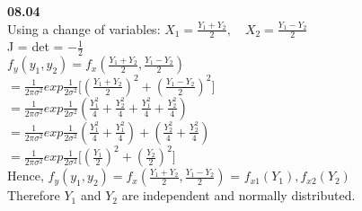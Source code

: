 {\bf 08.04} \\
 
Using a change of variables: \quad $X_1 = \frac{Y_1 + Y_2}{2}, \quad X_2 = \frac{Y_1 - Y_2}{2}$ \\
 
J = det = $ - \frac{1}{2}$ \\
 
$f_y{(y_1,y_2)} = f_x{\left (\frac{Y_1 + Y_2}{2},\frac{Y_1 - Y_2}{2} \right)}$ \\
 
$ = \frac{1}{2 \pi \sigma^2}exp{\frac{1}{2 \sigma^2}}\Big[{\left (\frac{Y_1 + Y_2}{2} \right)^2 + \left (\frac{Y_1 - Y_2}{2} \right)^2}\Big]$ \\
 
$ = \frac{1}{2 \pi \sigma^2}exp{\frac{1}{2 \sigma^2}}{\left (\frac{Y_1^2}{4} + \frac{Y_2^2}{4} + \frac{Y_1^2}{4} + \frac{Y_2^2}{4} \right)}$ \\
 
$ = \frac{1}{2 \pi \sigma^2}exp{\frac{1}{2 \sigma^2}}{\left (\frac{Y_1^2}{4} + \frac{Y_1^2}{4} \right) + \left (\frac{Y_2^2}{4} + \frac{Y_2^2}{4} \right)}$ \\
 
$ = \frac{1}{2 \pi \sigma^2}exp{\frac{1}{2 \sigma^2}}\Big[{\left (\frac{Y_1}{2} \right)^2 + \left (\frac{Y_2}{2} \right)^2}\Big]$ \\
 
Hence, $f_y{(y_1,y_2)} = f_x{\left (\frac{Y_1 + Y_2}{2},\frac{Y_1 - Y_2}{2} \right)}$ = $f_{x1}{(Y_1)},f_{x2}{(Y_2)}$ \\
 
Therefore $Y_1$ and $Y_2$ are independent and normally distributed. \\
